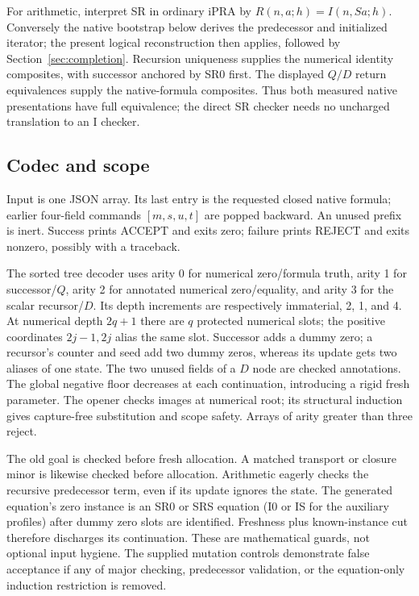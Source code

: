 For arithmetic, interpret SR in ordinary iPRA by
$R(n,a;h)=I(n,Sa;h)$. Conversely the native bootstrap below derives the
predecessor and initialized iterator; the present logical reconstruction
then applies, followed by Section~\ref{sec:completion}. Recursion uniqueness
supplies the numerical identity composites, with successor anchored by
SR0 first. The displayed $Q/D$ return equivalences supply the native-formula
composites. Thus both measured native presentations have full equivalence;
the direct SR checker needs no uncharged translation to an I checker.

\subsection{Codec and scope}

Input is one JSON array. Its last entry is the requested closed native
formula; earlier four-field commands $[m,s,u,t]$ are popped backward.
An unused prefix is inert. Success prints ACCEPT and exits zero; failure
prints REJECT and exits nonzero, possibly with a traceback.

The sorted tree decoder uses arity 0 for numerical zero/formula truth,
arity 1 for successor/$Q$, arity 2 for annotated numerical zero/equality,
and arity 3 for the scalar recursor/$D$. Its depth increments are
respectively immaterial, 2, 1, and 4. At numerical depth $2q+1$ there
are $q$ protected numerical slots; the positive coordinates $2j-1,2j$
alias the same slot. Successor adds a dummy zero; a recursor's counter
and seed add two dummy zeros, whereas its update gets two aliases of
one state. The two unused fields of a $D$ node are checked annotations.
The global negative floor decreases at each continuation, introducing
a rigid fresh parameter. The opener checks images at numerical root;
its structural induction gives capture-free substitution and scope
safety. Arrays of arity greater than three reject.

The old goal is checked before fresh allocation. A matched transport or
closure minor is likewise checked before allocation. Arithmetic eagerly
checks the recursive predecessor term, even if its update ignores the state.
The generated equation's zero instance is an SR0 or SRS equation (I0 or IS for the auxiliary profiles) after
dummy zero slots are identified. Freshness plus known-instance cut
therefore discharges its continuation. These are mathematical guards,
not optional input hygiene. The supplied mutation controls demonstrate
false acceptance if any of major checking, predecessor validation, or
the equation-only induction restriction is removed.

